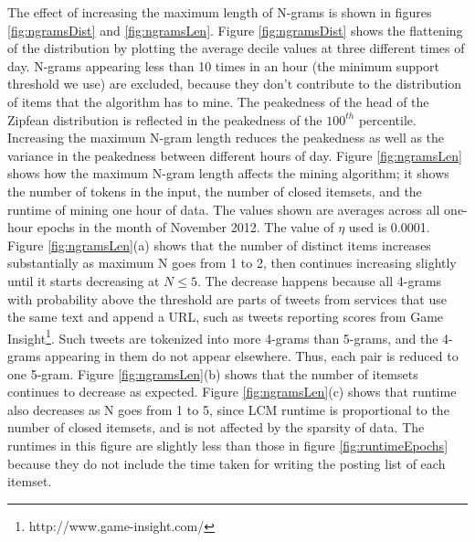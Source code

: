 \documentclass[letterpaper,12pt,titlepage,oneside,final]{book}
\begin{document}
The effect of increasing the maximum length of N-grams %
is shown in figures \ref{fig:ngramsDist} and  \ref{fig:ngramsLen}.
Figure \ref{fig:ngramsDist} shows the flattening of the distribution
by plotting the average decile values at three different times of day. 
N-grams appearing less than 10 times in an hour
(the minimum support threshold we use) are excluded,
because they don't contribute to the distribution of items
that the algorithm has to mine.
The peakedness of the head of the Zipfean distribution 
is reflected in the peakedness of the $100^{th}$ percentile.
Increasing the maximum N-gram length 
reduces the peakedness  as well as 
the variance in the peakedness between different
hours of day.
Figure \ref{fig:ngramsLen} shows how the maximum N-gram length
affects the mining algorithm; it shows
the number of tokens in the input, the number of closed itemsets,
and the runtime of mining one hour of data.
The values shown are averages across all one-hour epochs in the month of
November 2012.
The value of $\eta$ used is 0.0001.
Figure \ref{fig:ngramsLen}(a) shows that the number of distinct items
increases substantially as maximum N goes from 1 to 2, then continues increasing
slightly until it starts decreasing at $N \le 5$.
The decrease happens because all 4-grams with probability above the threshold
are parts of tweets from services that use the same text and append a URL,
such as tweets reporting scores from
Game Insight\footnote{http://www.game-insight.com/}.
Such tweets are tokenized into more 4-grams than 5-grams, and the 4-grams
appearing in them do not appear elsewhere.
Thus, each pair is reduced to one 5-gram.
Figure \ref{fig:ngramsLen}(b) shows that the number of itemsets continues to
decrease as expected.
Figure \ref{fig:ngramsLen}(c) shows that runtime also decreases as N goes
from 1 to 5, since LCM runtime is proportional to the number of closed
itemsets, and is not affected by the sparsity of data.
The runtimes in this figure are slightly less than those in
figure \ref{fig:runtimeEpochs} because they do not include the time taken for
writing the posting list of each itemset.
\end{document}
